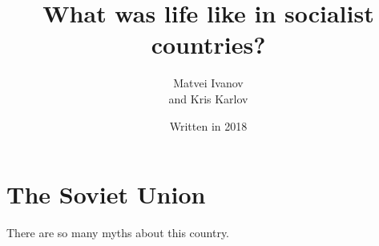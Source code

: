 \documentclass[a4paper]{book}%
\begin{document}
\fontsize{24}{28}\selectfont
\title{What was life like in socialist countries?}
\author{Matvei Ivanov \\ and Kris Karlov}
\date{Written in 2018}
\maketitle
\fontsize{24}{28}\selectfont
\chapter{The Soviet Union}
There are so many myths about this country.
\end{document}
